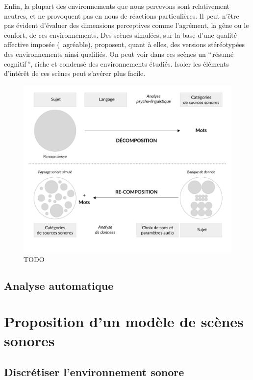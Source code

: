 \begin{itemize}
Enfin, la plupart des environnements que nous percevons sont relativement neutres, et ne provoquent pas en nous de réactions particulières. Il peut n'être pas évident d'évaluer des dimensions perceptives comme l'agrément, la gêne ou le confort, de ces environnements. Des scènes simulées, sur la base d'une qualité affective imposée (\eg~agréable), proposent, quant à elles, des versions stéréotypées des environnements ainsi qualifiés. On peut voir dans ces scènes un ``\,résumé cognitif\,'', riche et condensé des environnements étudiés. Isoler les éléments d'intérêt de ces scènes peut s'avérer plus facile.

\end{itemize}

\begin{figure}[t]
        \myfloatalign
        \includegraphics[width=.8\linewidth]{gfx/ch_4/1}
       \caption{TODO}\label{fig:paradigmeSimu1}
\end{figure}

\subsection{Analyse automatique}

\section{Proposition d'un modèle de scènes sonores}
\label{sec:ch4_model}

\subsection{Discrétiser l'environnement sonore}
\label{sec:ch4_modelInspi}


